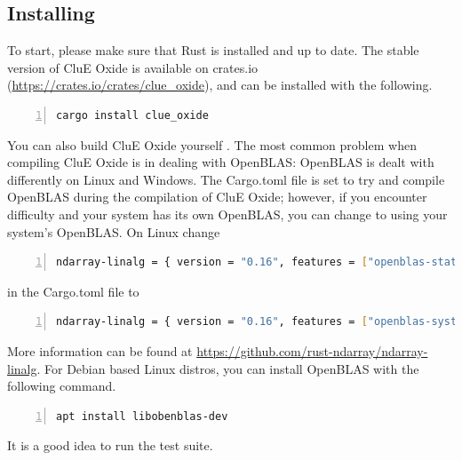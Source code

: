 \documentclass{book}
\begin{document}
\subsection{Installing}
To start, please make sure that Rust is installed and up to date\cite{rust}.
The stable version of CluE Oxide is available on crates.io 
(\url{https://crates.io/crates/clue_oxide}), and can be installed 
with the following.
\begin{lstlisting}[frame=single,numbers=left,language=bash]
cargo install clue_oxide
\end{lstlisting}
You can also build CluE Oxide yourself .
The most common problem when compiling CluE Oxide is in dealing with OpenBLAS:
OpenBLAS is dealt with differently on Linux and Windows.  
The Cargo.toml file is set to try and compile OpenBLAS during the compilation
of CluE Oxide; however, if you encounter difficulty and your system has
its own OpenBLAS, you can change to using your system's OpenBLAS.
On Linux change 
\begin{lstlisting}[frame=single,numbers=left,language=bash]
ndarray-linalg = { version = "0.16", features = ["openblas-static"] }     
\end{lstlisting}
in the Cargo.toml file to 
\begin{lstlisting}[frame=single,numbers=left,language=bash]
ndarray-linalg = { version = "0.16", features = ["openblas-system"] }     
\end{lstlisting}
More information can be found at
\url{https://github.com/rust-ndarray/ndarray-linalg}.   
For Debian based Linux distros, you can install OpenBLAS with the following 
command.
\begin{lstlisting}[frame=single,numbers=left,language=bash]
apt install libobenblas-dev
\end{lstlisting}
% 
It is a good idea to run the test suite.
\end{document}

